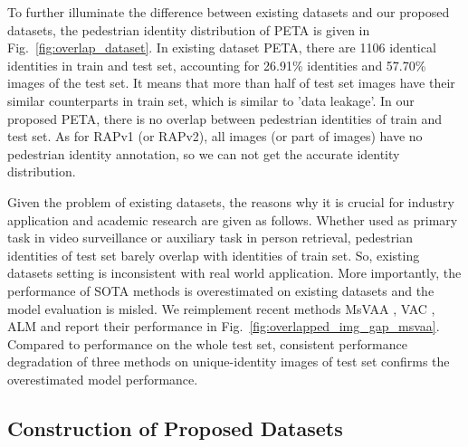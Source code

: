 \documentclass[runningheads]{llncs}
\begin{document}
To further illuminate the difference between existing datasets and our proposed datasets, the pedestrian identity distribution of PETA is given in Fig.~\ref{fig:overlap_dataset}. In existing dataset PETA, there are 1106 identical identities in train and test set, accounting for 26.91\% identities and 57.70\% images of the test set. It means that more than half of test set images have their similar counterparts in train set, which is similar to 'data leakage'. In our proposed PETA\textsubscript{}, there is no overlap between pedestrian identities of train and test set. As for RAPv1 (or RAPv2), all images (or part of images) have no pedestrian identity annotation, so we can not get the accurate identity distribution.

Given the problem of existing datasets, the reasons why it is crucial for industry application and academic research are given as follows. Whether used as primary task in video surveillance or auxiliary task in person retrieval, pedestrian identities of test set barely overlap with identities of train set. So, existing datasets setting is inconsistent with real world application. 
More importantly, the performance of SOTA methods is overestimated on existing datasets and the model evaluation is misled. 
We reimplement recent methods MsVAA \cite{sarafianos2018deep}, VAC \cite{guo2019visual}, ALM \cite{tang2019Improving} and report their performance in Fig.~\ref{fig:overlapped_img_gap_msvaa}. Compared to performance on the whole test set, consistent performance degradation of three methods on unique-identity images of test set confirms the overestimated model performance.

\subsection{Construction of Proposed Datasets}
\end{document}
